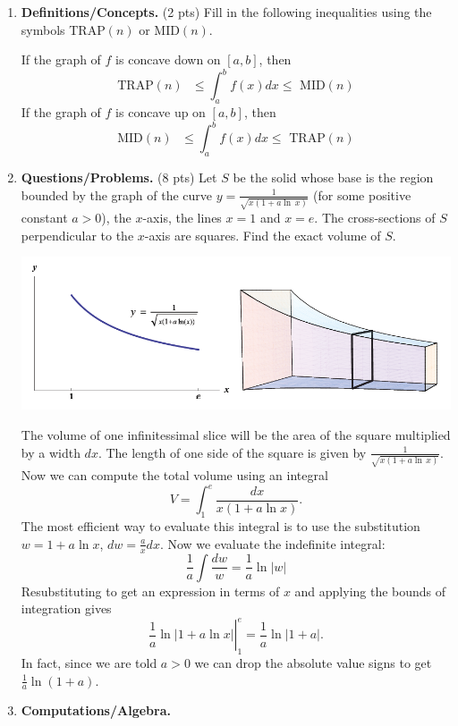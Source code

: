 \documentclass[11pt,letterpaper]{article}
\begin{document}
\begin{enumerate}

\item \textbf{Definitions/Concepts.} (2 pts) Fill in the following inequalities using the symbols TRAP$(n)$ or MID$(n)$.  

\smallskip
If the graph of $f$ is concave down on $[a,b]$, then
\[\text{TRAP$(n)$   }\leq\int_a^bf(x)dx\leq\text{   MID$(n)$}\]
If the graph of $f$ is concave up on $[a,b]$, then
\[\text{MID$(n)$   }\leq\int_a^bf(x)dx\leq\text{   TRAP$(n)$}\]

\vspace{1pc}
\item \textbf{Questions/Problems.} (8 pts)
\noindent Let $S$ be the solid whose base is the region bounded by the graph of the curve $y=\frac{1}{\sqrt{x(1+a\ln\,x)}}$ (for some positive constant $a>0$), the $x$-axis, the lines $x=1$ and $x=e$.  The cross-sections of $S$ perpendicular to the $x$-axis are squares.  Find the exact volume of $S$.
\smallskip
\begin{center}
\includegraphics[width=.9\textwidth]{quiz3pic.png}
\end{center}

The volume of one infinitessimal slice will be the area of the square multiplied by a width $dx$.  The length of one side of the square is given by $\frac{1}{\sqrt{x(1+a\ln\,x)}}$.  Now we can compute the total volume using an integral
\[V=\int_1^e\frac{dx}{x(1+a\ln{x})}.\]
The most efficient way to evaluate this integral is to use the substitution $w=1+a\ln{x}$, $dw=\frac{a}{x}dx$.  Now we evaluate the indefinite integral:
\[\frac{1}{a}\int\frac{dw}{w}=\frac{1}{a}\ln{|w|}\]
Resubstituting to get an expression in terms of $x$ and applying the bounds of integration gives
\[\left.\frac{1}{a}\ln{|1+a\ln{x}|}\right|_1^e=\frac{1}{a}\ln{|1+a|}.\]
In fact, since we are told $a>0$ we can drop the absolute value signs to get $\frac{1}{a}\ln{(1+a)}$.

\vspace{1pc}
\item \textbf{Computations/Algebra.} 


\end{enumerate}
\end{document}
